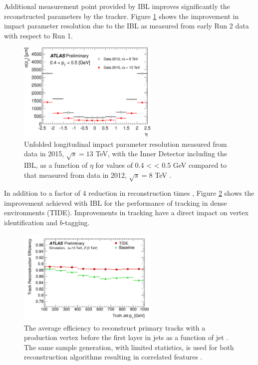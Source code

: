 Additional measurement point provided by IBL improves significantly the reconstructed parameters by the tracker. Figure \ref{fig:chap2:ATLAS:ITK:IBL:Imp} shows the improvement in impact parameter resolution due to the IBL as measured from early Run 2 data with respect to Run 1. 
\begin{figure}[htbp]
    \centering
    \includegraphics[width=0.6\textwidth]{Ch2/Img/IBL_impact.png}
    \caption{Unfolded longitudinal impact parameter resolution measured from data in 2015, $\sqrt{s}= 13$ TeV, with the Inner Detector including the IBL, as a function of $\eta$  for values of 0.4 < \pT < 0.5 GeV compared to that measured from data in 2012, $\sqrt{s} = 8$ TeV \cite{IBL_IP}.}
    \label{fig:chap2:ATLAS:ITK:IBL:Imp}
\end{figure}
In addition to a factor of 4 reduction in reconstruction times \cite{IBL_Time}, Figure \ref{fig:chap2:ATLAS:ITK:IBL:Trk} shows the improvement achieved with IBL for the performance of tracking in dense environments (TIDE). Improvements in tracking have a direct impact on vertex identification and $b$-tagging. 
\begin{figure}[htbp]
    \centering
    \includegraphics[width=0.6\textwidth]{Ch2/Img/IBL_track.png}
    \caption{The average efficiency to reconstruct primary tracks with a production vertex before the first layer in jets as a function of jet \pT. The same sample generation, with limited statistics, is used for both reconstruction algorithms resulting in correlated features \cite{IBL_Trk}.}
    \label{fig:chap2:ATLAS:ITK:IBL:Trk}
\end{figure}
